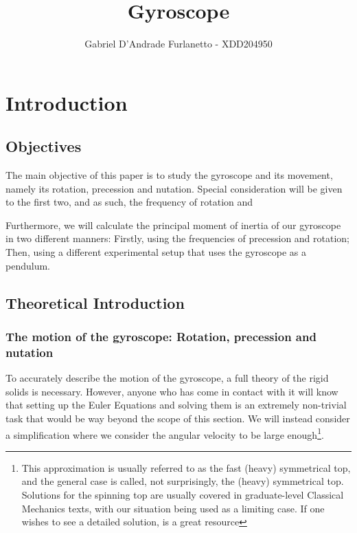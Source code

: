 \documentclass[a4paper,12pt]{article}
\begin{document}
\title{Gyroscope}
\author{Gabriel D'Andrade Furlanetto - XDD204950}
\maketitle


\pagebreak 
\section{Introduction}

\subsection{Objectives}

The main objective of this paper is to study the gyroscope and its movement, namely its rotation, precession and nutation. Special consideration will be given to the first two, and as such, the frequency of rotation and 

Furthermore, we will calculate the principal moment of inertia of our gyroscope in two different manners: Firstly, using the frequencies of precession and rotation; Then, using a different experimental setup that uses the gyroscope as a pendulum.

\subsection{Theoretical Introduction}

\subsubsection{The motion of the gyroscope: Rotation, precession and nutation}
To accurately describe the motion of the gyroscope, a full theory of the rigid solids is necessary. However, anyone who has come in contact with it will know that setting up the Euler Equations and solving them is an extremely non-trivial task that would be way beyond the scope of this section. We will instead consider a simplification where we consider the angular velocity to be large enough\footnote{This approximation is usually referred to as the fast (heavy) symmetrical top, and the general case is called, not surprisingly, the (heavy) symmetrical top. Solutions for the spinning top are usually covered in graduate-level Classical Mechanics texts, with our situation being used as a limiting case. If one wishes to see a detailed solution, \cite[208]{goldstein} is a great resource}. 
\end{document}
